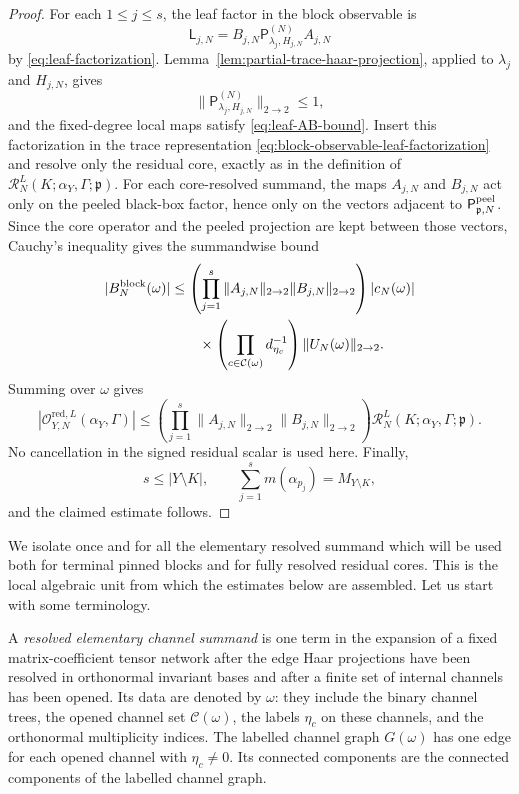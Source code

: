 \documentclass[11pt,a4paper,reqno]{amsart}
\theoremstyle{definition}
\theoremstyle{remark}
\begin{document}
\begin{proof}
For each $1\le j\le s$, the leaf factor in the block observable is
\[
\mathsf L_{j,N}=B_{j,N} \mathsf P_{\lambda_j,H_{j,N}}^{(N)} A_{j,N}
\]
by \eqref{eq:leaf-factorization}.  Lemma~\ref{lem:partial-trace-haar-projection}, applied to $\lambda_j$ and $H_{j,N}$, gives
\[
\|\mathsf P_{\lambda_j,H_{j,N}}^{(N)}\|_{2\to2}\le 1,
\]
and the fixed-degree local maps satisfy \eqref{eq:leaf-AB-bound}.  Insert this factorization in the trace representation \eqref{eq:block-observable-leaf-factorization} and resolve only the residual core, exactly as in the definition of $\mathcal R_N^L(K;\alpha_Y,\Gamma;\mathfrak p)$.  For each core-resolved summand, the maps $A_{j,N}$ and $B_{j,N}$ act only on the peeled black-box factor, hence only on the vectors adjacent to $\mathsf P^{\rm peel}_{\mathfrak p,N}$.  Since the core operator and the peeled projection are kept between those vectors, Cauchy's inequality gives the summandwise bound
\[
\begin{aligned}
|B_N^{\rm block}(\omega)|
&\le
\left(\prod_{j=1}^s
\|A_{j,N}\|_{2\to2}\|B_{j,N}\|_{2\to2}\right)
|c_N(\omega)|\\
&\qquad\times
\left(\prod_{c\in\mathcal C(\omega)}d_{\eta_c}^{-1}\right)
\|U_N(\omega)\|_{2\to2}.
\end{aligned}
\]
Summing over $\omega$ gives
\[
\left|\mathcal O_{Y,N}^{\mathrm{red},L}(\alpha_Y,\Gamma)\right|
\le
\left(\prod_{j=1}^s
\|A_{j,N}\|_{2\to2} \|B_{j,N}\|_{2\to2}\right)
\mathcal R_N^L(K;\alpha_Y,\Gamma;\mathfrak p).
\]
No cancellation in the signed residual scalar is used here.  Finally,
\[
s\le |Y\setminus K|,
\qquad
\sum_{j=1}^s m(\alpha_{p_j})=M_{Y\setminus K},
\]
and the claimed estimate follows.
\end{proof}


We isolate once and for all the elementary resolved summand which will be used both for terminal pinned blocks and for fully resolved residual cores.  This is the local algebraic unit from which the estimates below are assembled. Let us start with some terminology.

A \emph{resolved elementary channel summand} is one term in the expansion of a fixed matrix-coefficient tensor network after the edge Haar projections have been resolved in orthonormal invariant bases and after a finite set of internal channels has been opened.  Its data are denoted by $\omega$: they include the binary channel trees, the opened channel set $\mathcal C(\omega)$, the labels $\eta_c$ on these channels, and the orthonormal multiplicity indices.  The labelled channel graph $G(\omega)$ has one edge for each opened channel with $\eta_c\ne0$.  Its connected components are the connected components of the labelled channel graph.
\end{document}
